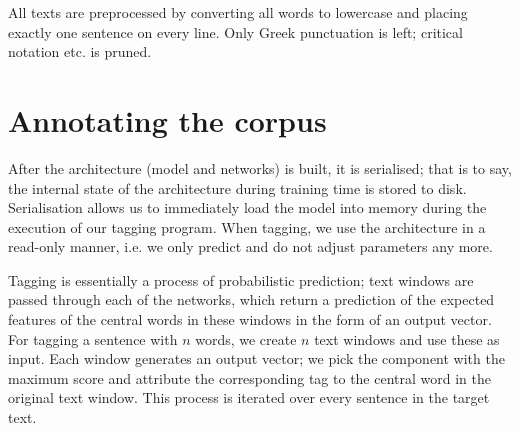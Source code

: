 All texts are preprocessed by converting all words to lowercase and
placing exactly one sentence on every line. Only Greek punctuation is
left; critical notation etc. is pruned.

\section{Annotating the corpus}
\label{sec:annotating}

After the architecture (model and networks) is built, it is
serialised; that is to say, the internal state of the architecture
during training time is stored to disk. Serialisation allows us to
immediately load the model into memory during the execution of our
tagging program. When tagging, we use the architecture in a read-only
manner, i.e. we only predict and do not adjust parameters any more.

Tagging is essentially a process of probabilistic prediction; text
windows are passed through each of the networks, which return a
prediction of the expected features of the central words in these
windows in the form of an output vector. For tagging a sentence with
$n$ words, we create $n$ text windows and use these as input. Each
window generates an output vector; we pick the component with the
maximum score and attribute the corresponding tag to the central word
in the original text window. This process is iterated over every
sentence in the target text. 

